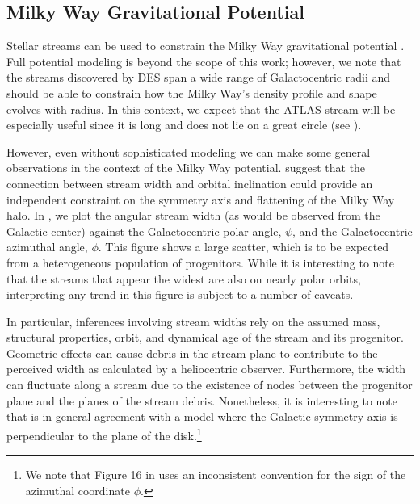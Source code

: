 \documentclass[twocolumn]{aastex61}
\begin{document}
\subsection{Milky Way Gravitational Potential}
\label{sec:flattening}

Stellar streams can be used to constrain the Milky Way gravitational potential \citep[e.g.,][]{Johnston:2005,Koposov:2010,Law:2010,Gibbons:2014,Bowden:2015,Kupper:2015,Bovy:2016}. 
Full potential modeling is beyond the scope of this work; however, we note that the streams discovered by DES span a wide range of Galactocentric radii and should be able to constrain how the Milky Way's density profile and shape evolves with radius. 
In this context, we expect that the ATLAS stream will be especially useful since it is long and does not lie on a great circle (see ).

However, even without sophisticated modeling we can make some general observations in the context of the Milky Way potential. 
\citet{Erkal:2016} suggest that the connection between stream width and orbital inclination could provide an independent constraint on the symmetry axis and flattening of the Milky Way halo.
In , we plot the angular stream width (as would be observed from the Galactic center) against the Galactocentric polar angle, $\psi$, and the Galactocentric azimuthal angle, $\phi$. This figure shows a large scatter, which is to be expected from a heterogeneous population of progenitors. While it is interesting to note that the streams that appear the widest are also on nearly polar orbits, interpreting any trend in this figure is subject to a number of caveats.

In particular, inferences involving stream widths rely on the assumed mass, structural properties, orbit, and dynamical age of the stream and its progenitor.
Geometric effects can cause debris in the stream plane to contribute to the perceived width as calculated by a heliocentric observer.
Furthermore, the width can fluctuate along a stream due to the existence of nodes between the progenitor plane and the planes of the stream debris.
Nonetheless, it is interesting to note that  is in general agreement with a model where the Galactic symmetry axis is perpendicular to the plane of the disk.\footnote{We note that Figure 16 in \citet{Erkal:2016} uses an inconsistent convention for the sign of the azimuthal coordinate $\phi$.}
\end{document}
